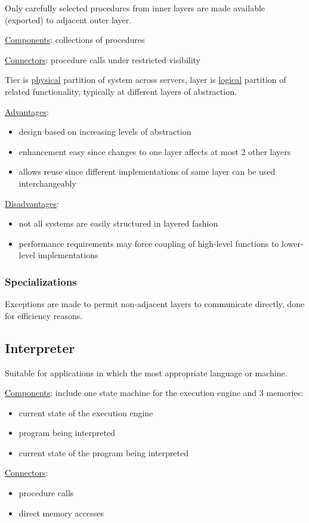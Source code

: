\documentclass[11pt]{article}
\begin{document}
Only carefully selected procedures from inner layers are made available (exported) to adjacent
outer layer.

\uline{Components}: collections of procedures

\uline{Connectors}: procedure calls under restricted visibility

Tier is \uline{physical} partition of system across servers, layer is \uline{logical} partition of related
functionality, typically at different layers of abstraction.

\uline{Advantages}:
\begin{itemize}
\item design based on increasing levels of abstraction
\item enhancement easy since changes to one layer affects at most 2 other layers
\item allows reuse since different implementations of same layer can be used interchangeably
\end{itemize}

\uline{Disadvantages}:
\begin{itemize}
\item not all systems are easily structured in layered fashion
\item performance requirements may force coupling of high-level functions to lower-level implementations
\end{itemize}
\subsubsection{Specializations}
\label{sec:org6864d88}
Exceptions are made to permit non-adjacent layers to communicate directly, done for
efficiency reasons.
\subsection{Interpreter}
\label{sec:orgc180ed1}
Suitable for applications in which the most appropriate language or machine.

\uline{Components}: include one state machine for the execution engine and 3 memories:
\begin{itemize}
\item current state of the execution engine
\item program being interpreted
\item current state of the program being interpreted
\end{itemize}

\uline{Connectors}:
\begin{itemize}
\item procedure calls
\item direct memory accesses
\end{itemize}
\end{document}
